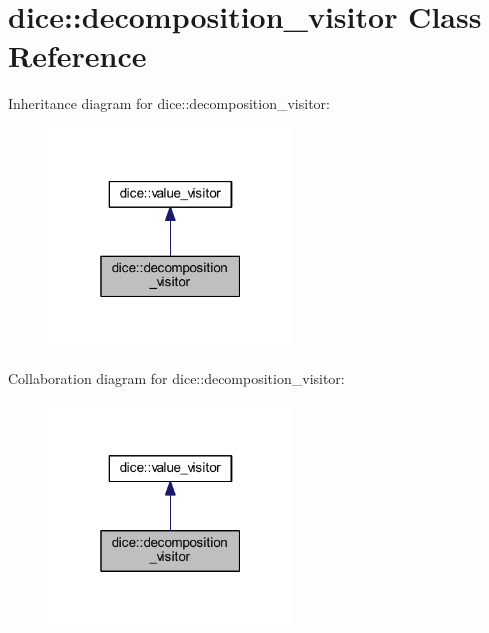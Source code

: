 \hypertarget{classdice_1_1decomposition__visitor}{}\section{dice\+:\+:decomposition\+\_\+visitor Class Reference}
\label{classdice_1_1decomposition__visitor}


Inheritance diagram for dice\+:\+:decomposition\+\_\+visitor\+:\nopagebreak
\begin{figure}[H]
\begin{center}
\leavevmode
\includegraphics[width=184pt]{classdice_1_1decomposition__visitor__inherit__graph}
\end{center}
\end{figure}


Collaboration diagram for dice\+:\+:decomposition\+\_\+visitor\+:\nopagebreak
\begin{figure}[H]
\begin{center}
\leavevmode
\includegraphics[width=184pt]{classdice_1_1decomposition__visitor__coll__graph}
\end{center}
\end{figure}
